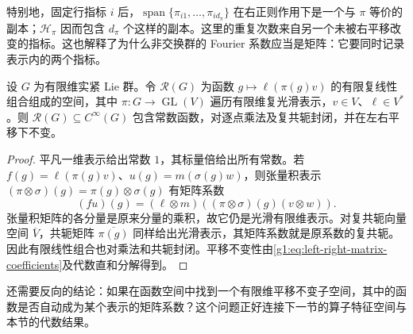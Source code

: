 特别地，固定行指标 \(i\) 后，\(\operatorname{span}\{\pi_{i1},\ldots,\pi_{id_\pi}\}\) 在右正则作用下是一个与 \(\pi\) 等价的副本；\(\mathcal H_\pi\) 因而包含 \(d_\pi\) 个这样的副本。这里的重复次数来自另一个未被右平移改变的指标。这也解释了为什么非交换群的 Fourier 系数应当是矩阵：它要同时记录表示内的两个指标。

\begin{proposition}\label{g1:prop:representative-function-algebra}
	设 \(G\) 为有限维实紧 Lie 群。令 \(\mathcal R(G)\) 为函数 \(g\mapsto\ell(\pi(g)v)\) 的有限复线性组合组成的空间，其中 \(\pi:G\to\operatorname{GL}(V)\) 遍历有限维复光滑表示，\(v\in V\)、\(\ell\in V^*\)。则 \(\mathcal R(G)\subseteq C^\infty(G)\) 包含常数函数，对逐点乘法及复共轭封闭，并在左右平移下不变。
\end{proposition}
\begin{proof}
	平凡一维表示给出常数 \(1\)，其标量倍给出所有常数。若 \(f(g)=\ell(\pi(g)v)\)、\(u(g)=m(\sigma(g)w)\)，则张量积表示 \((\pi\otimes\sigma)(g)=\pi(g)\otimes\sigma(g)\) 有矩阵系数
	\[
		(fu)(g)=(\ell\otimes m)((\pi\otimes\sigma)(g)(v\otimes w)).
	\]
	张量积矩阵的各分量是原来分量的乘积，故它仍是光滑有限维表示。对复共轭向量空间 \(\overline V\)，共轭矩阵 \(\overline{\pi(g)}\) 同样给出光滑表示，其矩阵系数就是原系数的复共轭。因此有限线性组合也对乘法和共轭封闭。平移不变性由\eqref{g1:eq:left-right-matrix-coefficients}及代数直和分解得到。
\end{proof}

还需要反向的结论：如果在函数空间中找到一个有限维平移不变子空间，其中的函数是否自动成为某个表示的矩阵系数？这个问题正好连接下一节的算子特征空间与本节的代数结果。

